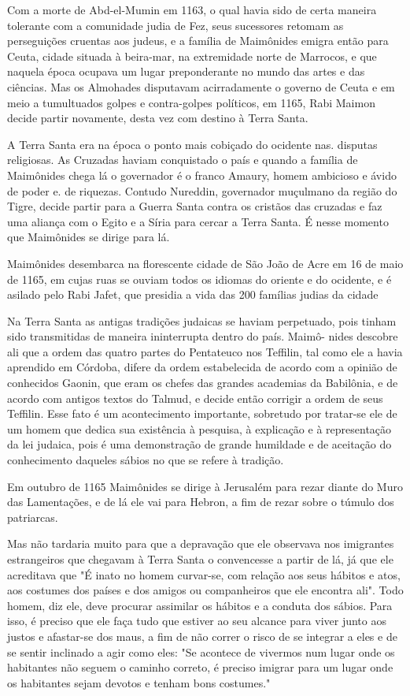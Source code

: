 Com a morte de Abd-el-Mumin em 1163, o qual havia sido de certa maneira
tolerante com a comunidade judia de Fez, seus sucessores retomam as
perseguições cruentas aos judeus, e a família de Maimônides emigra então
para Ceuta, cidade situada à beira-mar, na extremidade norte de
Marrocos, e que naquela época ocupava um lugar preponderante no mundo
das artes e das ciências. Mas os Almohades disputavam acirradamente o
governo de Ceuta e em meio a tumultuados golpes e contra-golpes
políticos, em 1165, Rabi Mai­mon decide partir novamente, desta vez com
destino à Terra Santa.

A Terra Santa era na época o ponto mais cobiçado do ocidente nas.
disputas religiosas. As Cruzadas haviam conquistado o país e quando a
família de Maimônides chega lá o governador é o franco Amaury, homem
ambicioso e ávido de poder e. de riquezas. Contudo Nureddin, governador
muçulmano da região do Tigre, decide partir para a Guerra Santa contra
os cristãos das cru­zadas e faz uma aliança com o Egito e a Síria para
cercar a Terra Santa. É nesse momento que Maimônides se dirige para lá.

Maimônides desembarca na florescente cidade de São João de Acre em 16 de
maio de 1165, em cujas ruas se ouviam todos os idiomas do oriente e do
ocidente, e é asilado pelo Rabi Jafet, que presidia a vida das 200
famílias judias da cidade

Na Terra Santa as antigas tradições judaicas se haviam perpetuado, pois
tinham sido transmitidas de maneira ininterrupta dentro do país. Maimô-
nides descobre ali que a ordem das quatro partes do Pentateuco nos
Teffilin, tal como ele a havia aprendido em Córdoba, difere da ordem
estabelecida de acordo com a opinião de conhecidos Gaonin, que eram os
chefes das grandes academias da Babilônia, e de acordo com antigos
textos do Talmud, e decide então corrigir a ordem de seus Teffilin. Esse
fato é um acontecimento impor­tante, sobretudo por tratar-se ele de um
homem que dedica sua existência à pesquisa, à explicação e à
representação da lei judaica, pois é uma demonstra­ção de grande
humildade e de aceitação do conhecimento daqueles sábios no que se
refere à tradição.

Em outubro de 1165 Maimônides se dirige à Jerusalém para rezar dian­te
do Muro das Lamentações, e de lá ele vai para Hebron, a fim de rezar
sobre o túmulo dos patriarcas.

Mas não tardaria muito para que a depravação que ele observava nos
imigrantes estrangeiros que chegavam à Terra Santa o convencesse a
partir de lá, já que ele acreditava que "É inato no homem curvar-se, com
relação aos seus hábitos e atos, aos costumes dos países e dos amigos ou
companheiros que ele encontra ali". Todo homem, diz ele, deve procurar
assimilar os hábitos e a con­duta dos sábios. Para isso, é preciso que
ele faça tudo que estiver ao seu alcan­ce para viver junto aos justos e
afastar-se dos maus, a fim de não correr o risco de se integrar a eles e
de se sentir inclinado a agir como eles: "Se acontece de vivermos num
lugar onde os habitantes não seguem o caminho correto, é pre­ciso
imigrar para um lugar onde os habitantes sejam devotos e tenham bons
costumes."

